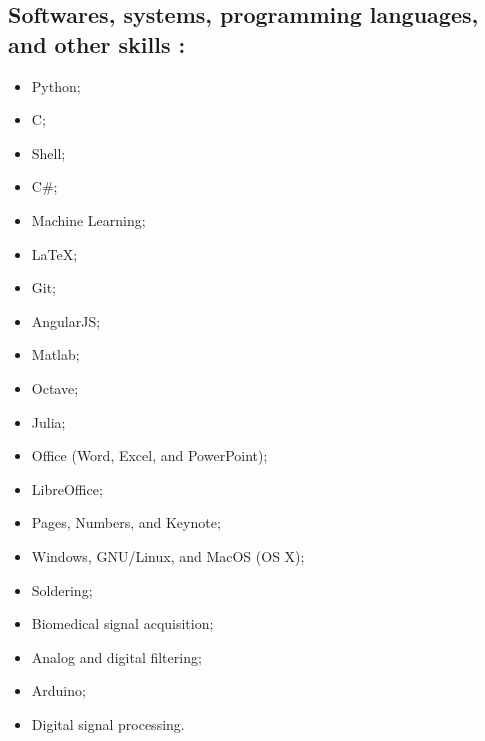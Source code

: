 \documentclass[11pt]{article}
\begin{document}
\subsection{Softwares, systems, programming languages, and other skills :}
\begin{multicols}{3} %
\begin{itemize}
    \item Python;
    \item C;
    \item Shell;
    \item C\#;
    \item Machine Learning;
    \item \LaTeX ;
    \item Git;
    \item AngularJS;
    \item Matlab;
    \item Octave;
    \item Julia;
    \item Office (Word, Excel, and PowerPoint);
    \item LibreOffice;
    \item Pages, Numbers, and Keynote;
    \item Windows, GNU/Linux, and MacOS (OS X);
    \item Soldering;
    \item Biomedical signal acquisition;
    \item Analog and digital filtering;
    \item Arduino;
    \item Digital signal processing.
\end{itemize}
\end{multicols}
\end{document}
